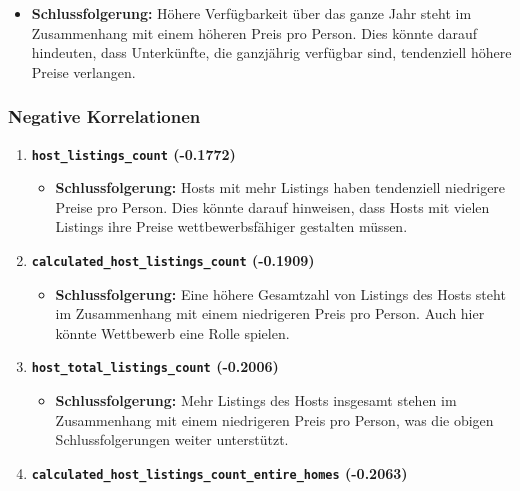 \documentclass[
  journal,
]{IEEEtran}%
\providecommand{\tightlist}{%
  \setlength{\itemsep}{0pt}\setlength{\parskip}{0pt}}\usepackage{longtable,booktabs,array}
\begin{document}
\begin{enumerate}
  \begin{itemize}
  \tightlist
  \item
    \textbf{Schlussfolgerung:} Höhere Verfügbarkeit über das ganze Jahr
    steht im Zusammenhang mit einem höheren Preis pro Person. Dies
    könnte darauf hindeuten, dass Unterkünfte, die ganzjährig verfügbar
    sind, tendenziell höhere Preise verlangen.
  \end{itemize}
\end{enumerate}

\subsubsection{Negative Korrelationen}\label{negative-korrelationen}

\begin{enumerate}
\def\labelenumi{\arabic{enumi}.}
\item
  \textbf{\texttt{host\_listings\_count} (-0.1772)}

  \begin{itemize}
  \tightlist
  \item
    \textbf{Schlussfolgerung:} Hosts mit mehr Listings haben tendenziell
    niedrigere Preise pro Person. Dies könnte darauf hinweisen, dass
    Hosts mit vielen Listings ihre Preise wettbewerbsfähiger gestalten
    müssen.
  \end{itemize}
\item
  \textbf{\texttt{calculated\_host\_listings\_count} (-0.1909)}

  \begin{itemize}
  \tightlist
  \item
    \textbf{Schlussfolgerung:} Eine höhere Gesamtzahl von Listings des
    Hosts steht im Zusammenhang mit einem niedrigeren Preis pro Person.
    Auch hier könnte Wettbewerb eine Rolle spielen.
  \end{itemize}
\item
  \textbf{\texttt{host\_total\_listings\_count} (-0.2006)}

  \begin{itemize}
  \tightlist
  \item
    \textbf{Schlussfolgerung:} Mehr Listings des Hosts insgesamt stehen
    im Zusammenhang mit einem niedrigeren Preis pro Person, was die
    obigen Schlussfolgerungen weiter unterstützt.
  \end{itemize}
\item
  \textbf{\texttt{calculated\_host\_listings\_count\_entire\_homes}
  (-0.2063)}


\end{enumerate}
\end{document}
